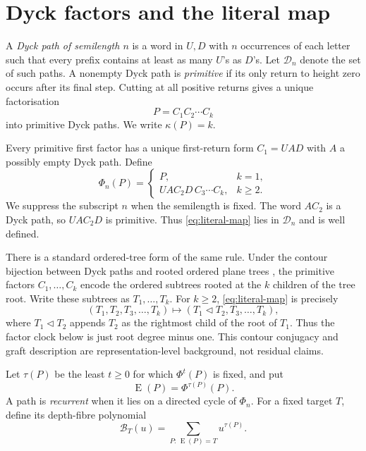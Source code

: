 \documentclass[10pt,a4paper]{amsart}
\theoremstyle{definition}
\theoremstyle{remark}
\newcommand{\Dyck}{\mathcal D}
\newcommand{\PhiMap}{\Phi}
\newcommand{\End}{\operatorname E}
\newcommand{\fac}{\kappa}
\newcommand{\Fib}{\mathcal B}
\begin{document}
\section{Dyck factors and the literal map}\label{sec:setup}

A \emph{Dyck path of semilength $n$} is a word in $U,D$ with $n$ occurrences
of each letter such that every prefix contains at least as many $U$'s as
$D$'s.  Let $\Dyck_n$ denote the set of such paths.  A nonempty Dyck path is
\emph{primitive} if its only return to height zero occurs after its final
step.  Cutting at all positive returns gives a unique factorisation
\begin{equation}\label{eq:primitive-factorisation}
                         P=C_1C_2\cdots C_k
\end{equation}
into primitive Dyck paths.  We write $\fac(P)=k$.

Every primitive first factor has a unique first-return form $C_1=UAD$ with
$A$ a possibly empty Dyck path.  Define
\begin{equation}\label{eq:literal-map}
 \PhiMap_n(P)=
 \begin{cases}
 P,&k=1,\\
 UAC_2D\,C_3\cdots C_k,&k\geq2.
 \end{cases}
\end{equation}
We suppress the subscript $n$ when the semilength is fixed.  The word
$AC_2$ is a Dyck path, so $UAC_2D$ is primitive.  Thus
\eqref{eq:literal-map} lies in $\Dyck_n$ and is well defined.

There is a standard ordered-tree form of the same rule.  Under the contour
bijection between Dyck paths and rooted ordered plane trees
\cite[Theorem~1.5.1]{Stanley2015Catalan}, the primitive factors
$C_1,\ldots,C_k$ encode the ordered subtrees rooted at the $k$ children of the
tree root.  Write these subtrees as $T_1,\ldots,T_k$.  For $k\geq2$,
\eqref{eq:literal-map} is precisely
\begin{equation}\label{eq:tree-graft}
 (T_1,T_2,T_3,\ldots,T_k)
 \longmapsto
 (T_1\mathbin{\triangleleft}T_2,T_3,\ldots,T_k),
\end{equation}
where $T_1\mathbin{\triangleleft}T_2$ appends $T_2$ as the rightmost child of
the root of $T_1$.  Thus the factor clock below is just root degree minus one.
This contour conjugacy and graft description are representation-level
background, not residual claims.

Let $\tau(P)$ be the least $t\geq0$ for which $\PhiMap^t(P)$ is fixed, and
put
\[
                         \End(P)=\PhiMap^{\tau(P)}(P).
\]
A path is \emph{recurrent} when it lies on a directed cycle of $\PhiMap_n$.
For a fixed target $T$, define its depth-fibre polynomial
\begin{equation}\label{eq:fibre-definition}
                 \Fib_T(u)=\sum_{P:\,\End(P)=T}u^{\tau(P)}.
\end{equation}
\end{document}
